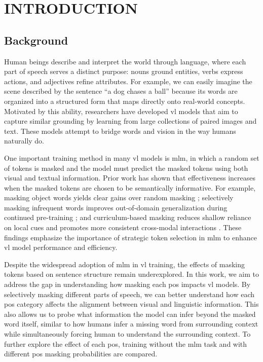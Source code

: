 \setlength{\parindent}{0in}
\setlength{\parskip}{1.5mm}
\setlength{\baselineskip}{1.6em}

\chapter{INTRODUCTION}
\section{Background}
Human beings describe and interpret the world through language, where each part of speech serves a distinct purpose: nouns ground entities, verbs express actions, and adjectives refine attributes. 
For example, we can easily imagine the scene described by the sentence “a dog chases a ball” because its words are organized into a structured form that maps directly onto real-world concepts. 
Motivated by this ability, researchers have developed \acrfull{vl} models that aim to capture similar grounding by learning from large collections of paired images and text. 
These models attempt to bridge words and vision in the way humans naturally do.

One important training method in many \acrshort{vl} models is \acrfull{mlm}, in which a random set of tokens is masked and the model must predict the masked tokens using both visual and textual information. 
Prior work has shown that effectiveness increases when the masked tokens are chosen to be semantically informative. 
For example, masking object words yields clear gains over random masking \cite{mask_object}; selectively masking infrequent words improves out-of-domain generalization during continued pre-training \cite{selective_masking}; and curriculum-based masking reduces shallow reliance on local cues and promotes more consistent cross-modal interactions \cite{rf-curriculum-masking}. 
These findings emphasize the importance of strategic token selection in \acrshort{mlm} to enhance \acrshort{vl} model performance and efficiency.

Despite the widespread adoption of \acrshort{mlm} in \acrshort{vl} training, the effects of masking tokens based on sentence structure remain underexplored.
In this work, we aim to address the gap in understanding how masking each \acrfull{pos} impacts \acrshort{vl} models.
By selectively masking different parts of speech, we can better understand how each \acrshort{pos} category affects the alignment between visual and linguistic information.
This also allows us to probe what information the model can infer beyond the masked word itself, similar to how humans infer a missing word from surrounding context while simultaneously forcing human to understand the surrounding context.
To further explore the effect of each \acrshort{pos}, training without the \acrshort{mlm} task and with different \acrshort{pos} masking probabilities are compared.

